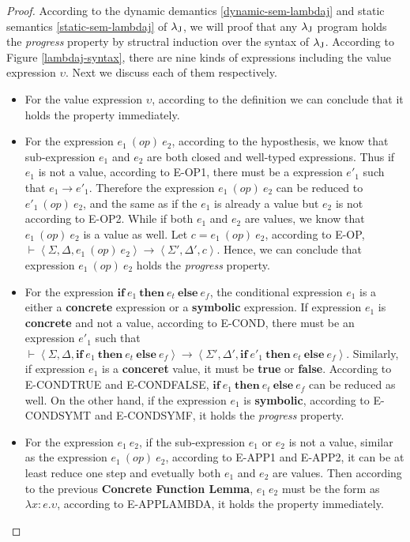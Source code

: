     \begin{proof}
        According to the dynamic demantics \ref{dynamic-sem-lambdaj} and static semantics \ref{static-sem-lambdaj} of ${\lambda_{\text{J}}}$, we will proof that any ${\lambda_{\text{J}}}$ program holds the \emph{progress} property by structral induction over the syntax of ${\lambda_{\text{J}}}$. According to Figure \ref{lambdaj-syntax}, there are nine kinds of expressions including the value expression $\upsilon$. Next we discuss each of them respectively.
        \begin{itemize}
            \item For the value expression $\upsilon$, according to the definition we can conclude that it holds the property immediately.
            \item For the expression $e_1~(op)~e_2$, according to the hyposthesis, we know that sub-expression $e_1$ and $e_2$ are both closed and well-typed expressions. Thus if $e_1$ is not a value, according to E-OP1, there must be a expression $e'_1$ such that $e_1\rightarrow e'_1$. Therefore the expression $e_1~(op)~e_2$ can be reduced to $e'_1~(op)~e_2$, and the same as if the $e_1$ is already a value but $e_2$ is not according to E-OP2. While if both $e_1$ and $e_2$ are values, we know that $e_1~(op)~e_2$ is a value as well. Let $c = e_1~(op)~e_2$, according to E-OP, $\vdash\left\langle\Sigma, \Delta, e_1~(op)~e_2 \right\rangle\rightarrow\left\langle\Sigma',\Delta',c \right\rangle$. Hence, we can conclude that expression $e_1~(op)~e_2$ holds the \emph{progress} property.
            \item For the expression $\textbf{if}~e_1~\textbf{then}~e_t~\textbf{else}~e_f$, the conditional expression $e_1$ is a either a \textbf{concrete} expression or a \textbf{symbolic} expression. If expression $e_1$ is \textbf{concrete} and not a value, according to E-COND, there must be an expression $e'_1$ such that $\vdash\left\langle\Sigma, \Delta, \textbf{if}~e_1~\textbf{then}~e_t~\textbf{else}~e_f \right\rangle\rightarrow\left\langle\Sigma',\Delta',\textbf{if}~e'_1~\textbf{then}~e_t~\textbf{else}~e_f \right\rangle$.  Similarly, if expression $e_1$ is a \textbf{conceret} value, it must be \textbf{true} or \textbf{false}. According to E-CONDTRUE and E-CONDFALSE, $\textbf{if}~e_1~\textbf{then}~e_t~\textbf{else}~e_f$ can be reduced as well. On the other hand, if the expression $e_1$ is \textbf{symbolic}, according to E-CONDSYMT and E-CONDSYMF, it holds the \emph{progress} property.
            \item For the expression $e_1~e_2$, if the sub-expression $e_1$ or $e_2$ is not a value, similar as the expression $e_1~(op)~e_2$, according to E-APP1 and E-APP2, it can be at least reduce one step and evetually both $e_1$ and $e_2$ are values. Then according to the previous \textbf{Concrete Function Lemma}, $e_1~e_2$ must be the form as $\lambda x:e.\upsilon$, according to E-APPLAMBDA, it holds the property immediately.

\end{itemize}
\end{proof}
